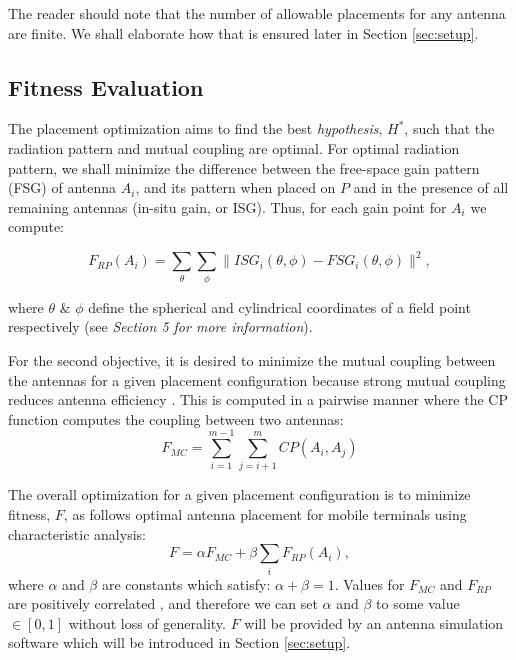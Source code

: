 \documentclass{sig-alternate}
\begin{document}
The reader should note that the number of allowable placements for any antenna are finite. We shall elaborate how that is ensured later in Section \ref{sec:setup}.

\subsection{Fitness Evaluation}
The placement optimization aims to find the best \textit{hypothesis}, $H^*$, such that the radiation pattern and mutual coupling are optimal. For optimal radiation pattern, we shall minimize the difference between the free-space gain pattern (FSG) of antenna $A_i$, and its pattern when placed on $P$ and in the presence of all remaining antennas (in-situ gain, or ISG).  Thus, for each gain point for $A_i$ we compute:

\begin{equation} \label{eq:rp}
  F_{RP}(A_i) = \sum_{\theta}\sum_{\phi} 
           \| ISG_i(\theta,\phi) - FSG_i(\theta,\phi) \| ^2,
\end{equation}

where $\theta$ \& $\phi$ define the spherical and cylindrical coordinates of a field point respectively (see \textit{Section 5 for more information}).

For the second objective, it is desired to minimize the mutual coupling between the antennas for a given placement configuration because strong mutual coupling reduces antenna efficiency \cite{leivo2009improving}. This is computed in a pairwise manner where the CP function computes the coupling between two antennas:
\begin{equation}
  F_{MC} = \sum_{i=1}^{m-1}\sum_{j=i+1}^{m} CP(A_i, A_j)
\end{equation}

The overall optimization for a given placement configuration is to minimize fitness, $F$, as follows optimal antenna placement for mobile terminals using characteristic analysis:
\begin{equation} \label{eq:optimal}
  F = \alpha F_{MC} + \beta \sum_{i} F_{RP}(A_i),
\end{equation}
where $\alpha$ and $\beta$ are constants which satisfy: $\alpha + \beta = 1$. Values for $F_{MC}$ and $F_{RP}$ are positively correlated \cite{stjernman2006antenna}, and therefore we can set $\alpha$ and $\beta$ to some value $\in [0,1]$ without loss of generality. $F$ will be provided by an antenna simulation software which will be introduced in Section \ref{sec:setup}.
\end{document}
